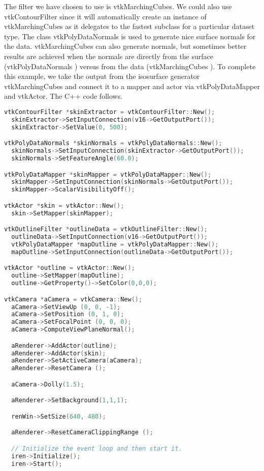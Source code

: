 The filter we have chosen to use is vtkMarchingCubes. We could also use vtkContourFilter since it will automatically create an instance of vtkMarchingCubes as it delegates to the fastest subclass for a particular dataset type. The class vtkPolyDataNormals is used to generate nice surface normals for the data. vtkMarchingCubes can also generate normals, but sometimes better results are achieved when the normals are directly from the surface (vtkPolyDataNormals ) versus from the data (vtkMarchingCubes ). To complete this example, we take the output from the isosurface generator vtkMarchingCubes and connect it to a mapper and actor via
vtkPolyDataMapper and vtkActor. The C++ code follows.

\begin{lstlisting}[language=C++, caption={Creating an isosurface.}, escapechar=\$]
vtkContourFilter *skinExtractor = vtkContourFilter::New();
  skinExtractor->SetInputConnection(v16->GetOutputPort());
  skinExtractor->SetValue(0, 500);

vtkPolyDataNormals *skinNormals = vtkPolyDataNormals::New();
  skinNormals->SetInputConnection(skinExtractor->GetOutputPort());
  skinNormals->SetFeatureAngle(60.0);

vtkPolyDataMapper *skinMapper = vtkPolyDataMapper::New();
  skinMapper->SetInputConnection(skinNormals->GetOutputPort());
  skinMapper->ScalarVisibilityOff();

vtkActor *skin = vtkActor::New();
  skin->SetMapper(skinMapper);

vtkOutlineFilter *outlineData = vtkOutlineFilter::New();
  outlineData->SetInputConnection(v16->GetOutputPort());
  vtkPolyDataMapper *mapOutline = vtkPolyDataMapper::New();
  mapOutline->SetInputConnection(outlineData->GetOutputPort());

vtkActor *outline = vtkActor::New();
  outline->SetMapper(mapOutline);
  outline->GetProperty()->SetColor(0,0,0);

vtkCamera *aCamera = vtkCamera::New();
  aCamera->SetViewUp (0, 0, -1);
  aCamera->SetPosition (0, 1, 0);
  aCamera->SetFocalPoint (0, 0, 0);
  aCamera->ComputeViewPlaneNormal();

  aRenderer->AddActor(outline);
  aRenderer->AddActor(skin);
  aRenderer->SetActiveCamera(aCamera);
  aRenderer->ResetCamera ();

  aCamera->Dolly(1.5);

  aRenderer->SetBackground(1,1,1);

  renWin->SetSize(640, 480);

  aRenderer->ResetCameraClippingRange ();

  // Initialize the event loop and then start it.
  iren->Initialize();
  iren->Start();
\end{lstlisting}

